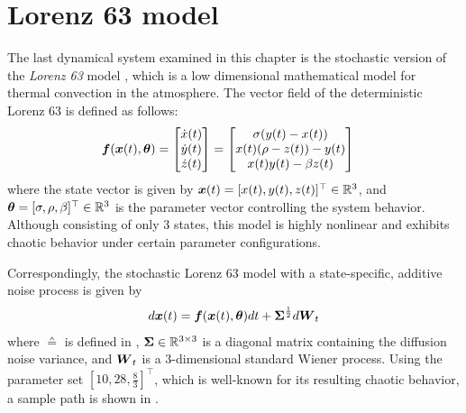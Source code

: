 \section{Lorenz 63 model}
\label{sec-lorenz-63}

The last dynamical system examined in this chapter is the stochastic version of the \emph{Lorenz 63} model \citep{lorenz1963deterministic}, which is a low dimensional mathematical model for thermal convection in the atmosphere.
The vector field of the deterministic Lorenz 63 is defined as follows:
\begin{align}
    \boldsymbol{f}(\boldsymbol{x}(t), \boldsymbol{\theta})
    & =
    \begin{bmatrix}
        \dot{x}(t)
        \\ 
        \dot{y}(t)
        \\
        \dot{z}(t)
    \end{bmatrix}
    =
    \begin{bmatrix}
        \sigma(y(t) - x(t))
        \\
        x(t)(\rho - z(t)) - y(t)
        \\
        x(t)y(t) - \beta z(t)
    \end{bmatrix}
    \label{eq-lorenz-63-odes}
\end{align}
where the state vector is given by $\boldsymbol{x}(t) = [x(t), y(t), z(t)]^\top \in \mathbb{R}^3$, and $\boldsymbol{\theta} = [\sigma, \rho, \beta]^\top \in \mathbb{R}^3$ is the parameter vector controlling the system behavior.
Although consisting of only 3 states, this model is highly nonlinear and exhibits chaotic behavior under certain parameter configurations.

Correspondingly, the stochastic Lorenz 63 model with a state-specific, additive noise process is given by
\begin{align}
    d\boldsymbol{x}(t) = \boldsymbol{f}(\boldsymbol{x}(t), \boldsymbol{\theta}) dt + \boldsymbol{\Sigma}^\frac{1}{2}d\boldsymbol{W}_t
\end{align}
where $\sdef$ is defined in , $\boldsymbol{\Sigma} \in \mathbb{R}^{3 \times 3}$ is a diagonal matrix containing the diffusion noise variance, and $\boldsymbol{W}_t$ is a 3-dimensional standard Wiener process.
Using the parameter set $[10, 28, \frac{8}{3}]^\top$, which is well-known for its resulting chaotic behavior, a sample path is shown in .

